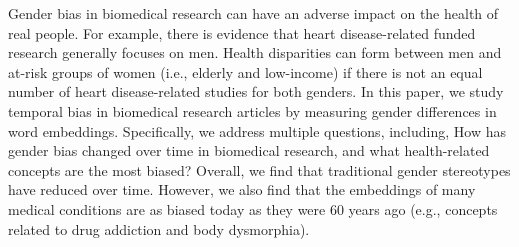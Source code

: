 Gender bias in biomedical research can have an adverse impact on the health of real people. For example, there is evidence that heart disease-related funded research generally focuses on men. Health disparities can form between men and at-risk groups of women (i.e., elderly and low-income) if there is not an equal number of heart disease-related studies for both genders. In this paper, we study temporal bias in biomedical research articles by measuring gender differences in word embeddings. Specifically, we address multiple questions, including, How has gender bias changed over time in biomedical research, and what health-related concepts are the most biased? Overall, we find that traditional gender stereotypes have reduced over time. However, we also find that the embeddings of many medical conditions are as biased today as they were 60 years ago (e.g., concepts related to drug addiction and body dysmorphia).
